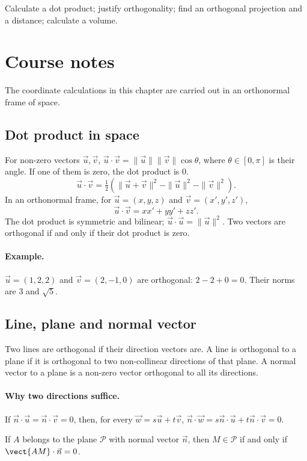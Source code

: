 \label{ch:11}


\begin{keypoint}[Objectives]Calculate a dot product; justify orthogonality; find an orthogonal projection and a distance; calculate a volume.\end{keypoint}

\section{Course notes}
The coordinate calculations in this chapter are carried out in an orthonormal frame of space.
\subsection{Dot product in space}
For non-zero vectors $\vec u,\vec v$, $\vec u\cdot\vec v=\|\vec u\|\|\vec v\|\cos\theta$, where $\theta\in[0,\pi]$ is their angle. If one of them is zero, the dot product is $0$.
\[\vec u\cdot\vec v=\tfrac12(\|\vec u+\vec v\|^2-\|\vec u\|^2-\|\vec v\|^2).
\]
In an orthonormal frame, for $\vec u=(x,y,z)$ and $\vec v=(x',y',z')$,
\[\vec u\cdot\vec v=xx'+yy'+zz'.\]
The dot product is symmetric and bilinear; $\vec u\cdot\vec u=\|\vec u\|^2$. Two vectors are orthogonal if and only if their dot product is zero.
\paragraph{Example.} $\vec u=(1,2,2)$ and $\vec v=(2,-1,0)$ are orthogonal: $2-2+0=0$. Their norms are $3$ and $\sqrt5$.
\subsection{Line, plane and normal vector}
Two lines are orthogonal if their direction vectors are. A line is orthogonal to a plane if it is orthogonal to two non-collinear directions of that plane. A normal vector to a plane is a non-zero vector orthogonal to all its directions.
\paragraph{Why two directions suffice.} If $\vec n\cdot\vec u=\vec n\cdot\vec v=0$, then, for every $\vec w=s\vec u+t\vec v$, $\vec n\cdot\vec w=s\vec n\cdot\vec u+t\vec n\cdot\vec v=0$.
\begin{keypoint}
If $A$ belongs to the plane $\mathcal P$ with normal vector $\vec n$, then $M\in\mathcal P$ if and only if $\vect{AM}\cdot\vec n=0$.
\end{keypoint}
